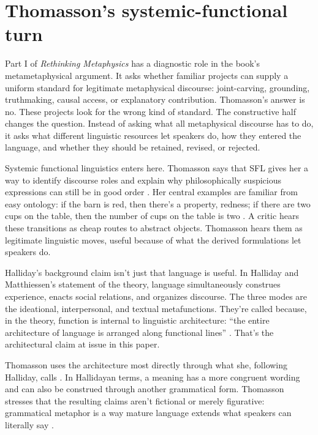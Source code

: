 \documentclass[12pt]{article}
\begin{document}
\section{Thomasson's systemic-functional turn}
Part I of \emph{Rethinking Metaphysics} has a diagnostic role in the book's metametaphysical argument. It asks whether familiar projects can supply a uniform standard for legitimate metaphysical discourse: joint-carving, grounding, truthmaking, causal access, or explanatory contribution. Thomasson's answer is no. These projects look for the wrong kind of standard. The constructive half changes the question. Instead of asking what all metaphysical discourse has to do, it asks what different linguistic resources let speakers do, how they entered the language, and whether they should be retained, revised, or rejected.

Systemic functional linguistics enters here. Thomasson says that SFL gives her a way to identify discourse roles and explain why philosophically suspicious expressions can still be in good order \citep[133--160]{thomasson2025rethink}. Her central examples are familiar from easy ontology: if the barn is red, then there's a property, redness; if there are two cups on the table, then the number of cups on the table is two \citep[169--179]{thomasson2025rethink}. A critic hears these transitions as cheap routes to abstract objects. Thomasson hears them as legitimate linguistic moves, useful because of what the derived formulations let speakers do.

Halliday's background claim isn't just that language is useful. In Halliday and Matthiessen's statement of the theory, language simultaneously construes experience, enacts social relations, and organizes discourse. The three modes are the ideational, interpersonal, and textual metafunctions. They're called  because, in the theory, function is internal to linguistic architecture: \enquote{the entire architecture of language is arranged along functional lines} \citep[30--31]{hallidayMatthiessen2014introduction}. That's the architectural claim at issue in this paper.

Thomasson uses the architecture most directly through what she, following Halliday, calls . In Hallidayan terms, a meaning has a more congruent wording and can also be construed through another grammatical form. Thomasson stresses that the resulting claims aren't fictional or merely figurative: grammatical metaphor is a way mature language extends what speakers can literally say \citep[154--156]{thomasson2025rethink}.
\end{document}

